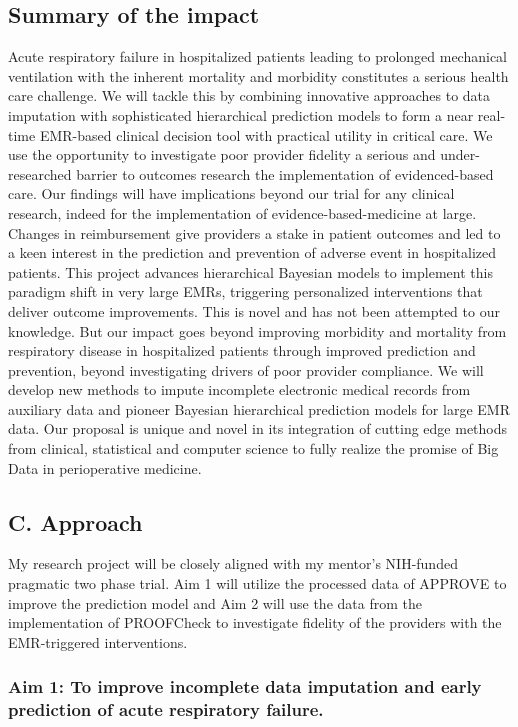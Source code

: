 \documentclass[11pt,notitlepage]{article}
\begin{document}
\subsection*{Summary of the impact}
Acute respiratory failure in hospitalized patients leading to prolonged mechanical ventilation with the inherent mortality and morbidity constitutes a serious health care challenge. We will tackle this by combining innovative approaches to data imputation with sophisticated hierarchical prediction models to form a near real-time EMR-based clinical decision tool with practical utility in critical care. We use the opportunity to investigate poor provider fidelity a serious and under-researched barrier to outcomes research the implementation of evidenced-based care. Our findings will have implications beyond our trial for any clinical research, indeed for the implementation of evidence-based-medicine at large. Changes in reimbursement give providers a stake in patient outcomes and led to a keen interest in the prediction and prevention of adverse event in hospitalized patients. This project advances hierarchical Bayesian models to implement this paradigm shift in very large EMRs, triggering personalized interventions that deliver outcome improvements. This is novel and has not been attempted to our knowledge. But our impact goes beyond improving morbidity and mortality from respiratory disease in hospitalized patients through improved prediction and prevention, beyond investigating drivers of poor provider compliance. We will develop new methods to impute incomplete electronic medical records from auxiliary data and pioneer Bayesian hierarchical prediction models for large EMR data. Our proposal is unique and novel in its integration of cutting edge methods from clinical, statistical and computer science to fully realize the promise of Big Data in perioperative medicine.

\subsection*{C. Approach}
My research project will be closely aligned with my mentor's NIH-funded pragmatic two phase trial. Aim 1 will utilize the processed data of APPROVE to improve the prediction model and Aim 2 will use the data from the implementation of PROOFCheck to investigate fidelity of the providers with the EMR-triggered interventions.

\subsubsection*{Aim 1: To improve incomplete data imputation and early prediction of acute respiratory failure.}
\end{document}
